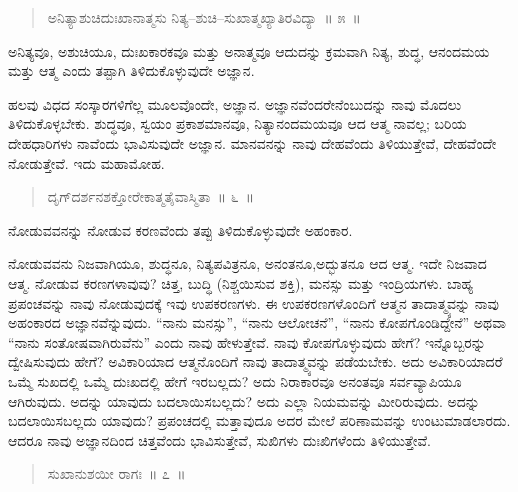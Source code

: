 \vspace{-0.3cm}

\begin{verse}
ಅನಿತ್ಯಾಶುಚಿದುಃಖಾನಾತ್ಮಸು ನಿತ್ಯ–ಶುಚಿ–ಸುಖಾತ್ಮಖ್ಯಾತಿರವಿದ್ಯಾ~॥ ೫~॥
\end{verse}

\vspace{-0.3cm}

ಅನಿತ್ಯವೂ, ಅಶುಚಿಯೂ, ದುಃಖಕಾರಕವೂ ಮತ್ತು ಅನಾತ್ಮವೂ ಆದುದನ್ನು ಕ್ರಮವಾಗಿ ನಿತ್ಯ, ಶುದ್ಧ, ಆನಂದಮಯ ಮತ್ತು ಆತ್ಮ ಎಂದು ತಪ್ಪಾಗಿ ತಿಳಿದುಕೊಳ್ಳುವುದೇ ಅಜ್ಞಾನ. 

ಹಲವು ವಿಧದ ಸಂಸ್ಕಾರಗಳಿಗೆಲ್ಲ ಮೂಲವೊಂದೇ, ಅಜ್ಞಾನ. ಅಜ್ಞಾನವೆಂದರೇನೆಂಬು\break ದನ್ನು ನಾವು ಮೊದಲು ತಿಳಿದುಕೊಳ್ಳಬೇಕು. ಶುದ್ಧವೂ, ಸ್ವಯಂ ಪ್ರಕಾಶಮಾನವೂ, ನಿತ್ಯಾನಂದಮಯವೂ ಆದ ಆತ್ಮ ನಾವಲ್ಲ; ಬರಿಯ ದೇಹಧಾರಿಗಳು ನಾವೆಂದು ಭಾವಿಸುವುದೇ ಅಜ್ಞಾನ. ಮಾನವನನ್ನು ನಾವು ದೇಹವೆಂದು ತಿಳಿಯುತ್ತೇವೆ, ದೇಹವೆಂದೇ ನೋಡುತ್ತೇವೆ. ಇದು ಮಹಾಮೋಹ. 

\vspace{-0.3cm}

\begin{verse}
ದೃಗ್​ದರ್ಶನಶಕ್ತೋರೇಕಾತ್ಮತೈವಾಸ್ಮಿತಾ~॥ ೬~॥
\end{verse}

\vspace{-0.3cm}

ನೋಡುವವನನ್ನು ನೋಡುವ ಕರಣವೆಂದು ತಪ್ಪು ತಿಳಿದುಕೊಳ್ಳುವುದೇ ಅಹಂಕಾರ. 

ನೋಡುವವನು ನಿಜವಾಗಿಯೂ, ಶುದ್ಧನೂ, ನಿತ್ಯಪವಿತ್ರನೂ, ಅನಂತನೂ,\break ಅದ್ಭುತನೂ ಆದ ಆತ್ಮ. ಇದೇ ನಿಜವಾದ ಆತ್ಮ. ನೋಡುವ ಕರಣಗಳಾವುವು? ಚಿತ್ತ, ಬುದ್ಧಿ (ನಿಶ್ಚಯಿಸುವ ಶಕ್ತಿ), ಮನಸ್ಸು ಮತ್ತು ಇಂದ್ರಿಯಗಳು. ಬಾಹ್ಯ ಪ್ರಪಂಚವನ್ನು ನಾವು ನೋಡುವುದಕ್ಕೆ ಇವು ಉಪಕರಣಗಳು. ಈ ಉಪಕರಣಗಳೊಂದಿಗೆ ಆತ್ಮನ ತಾದಾತ್ಮ್ಯವನ್ನು ನಾವು ಅಹಂಕಾರದ ಅಜ್ಞಾನವೆನ್ನುವುದು. “ನಾನು ಮನಸ್ಸು”, “ನಾನು ಆಲೋಚನೆ”, “ನಾನು ಕೋಪಗೊಂಡಿದ್ದೇನೆ” ಅಥವಾ “ನಾನು ಸಂತೋಷವಾಗಿರುವೆನು” ಎಂದು ನಾವು ಹೇಳುತ್ತೇವೆ. ನಾವು ಕೋಪಗೊಳ್ಳುವುದು ಹೇಗೆ? ಇನ್ನೊಬ್ಬರನ್ನು ದ್ವೇಷಿಸುವುದು ಹೇಗೆ? ಅವಿಕಾರಿಯಾದ ಆತ್ಮನೊಂದಿಗೆ ನಾವು ತಾದಾತ್ಮ್ಯವನ್ನು ಪಡೆಯಬೇಕು. ಅದು ಅವಿಕಾರಿಯಾದರೆ ಒಮ್ಮೆ ಸುಖದಲ್ಲಿ ಒಮ್ಮೆ ದುಃಖದಲ್ಲಿ ಹೇಗೆ ಇರಬಲ್ಲದು? ಅದು ನಿರಾಕಾರವೂ ಅನಂತವೂ ಸರ್ವವ್ಯಾಪಿಯೂ ಆಗಿರುವುದು. ಅದನ್ನು ಯಾವುದು ಬದಲಾಯಿಸಬಲ್ಲದು? ಅದು ಎಲ್ಲಾ ನಿಯಮವನ್ನು ಮೀರಿರುವುದು. ಅದನ್ನು ಬದಲಾಯಿಸಬಲ್ಲದು ಯಾವುದು? ಪ್ರಪಂಚದಲ್ಲಿ ಮತ್ತಾವುದೂ ಅದರ ಮೇಲೆ ಪರಿಣಾಮವನ್ನು ಉಂಟುಮಾಡಲಾರದು. ಆದರೂ ನಾವು ಅಜ್ಞಾನದಿಂದ ಚಿತ್ತವೆಂದು ಭಾವಿಸುತ್ತೇವೆ, ಸುಖಿಗಳು ದುಃಖಿಗಳೆಂದು ತಿಳಿಯುತ್ತೇವೆ. 

\vspace{-0.3cm}

\begin{verse}
ಸುಖಾನುಶಯೀ ರಾಗಃ~॥ ೭~॥
\end{verse}

\vspace{-0.3cm}

